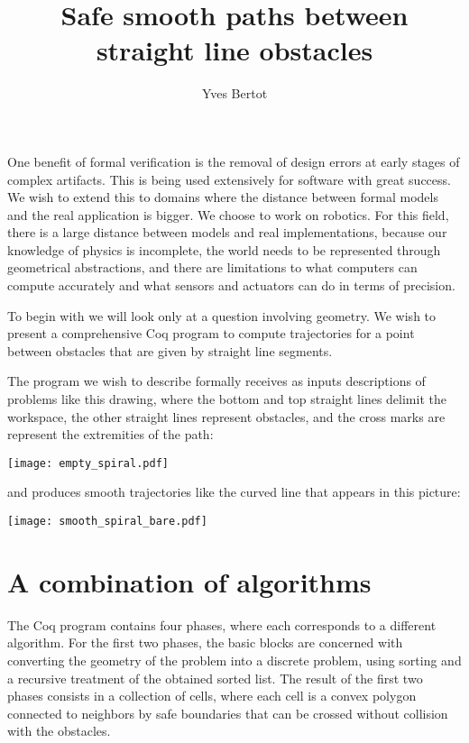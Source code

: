 \documentclass{easychair}
\title{Safe smooth paths between straight line obstacles}
\author{Yves Bertot}
\institute{Inria Université Côte d'Azur}
\begin{document}
\maketitle

One benefit of formal verification is the removal of design errors at early
stages of complex artifacts.  This is being used extensively for software
with great success.  We wish to
extend this to domains where the distance between formal models and the
real application is bigger.  We choose to work on robotics.  For this
field, there is a large distance between models and real implementations,
because our knowledge of physics is incomplete,
the world needs to be represented through geometrical abstractions, and
there are limitations to what computers can compute accurately and what
sensors and actuators can do in terms of precision.

To begin with
we will look only at a question involving geometry.  
We wish to present a comprehensive Coq program
to compute trajectories for a point between obstacles that are given by straight
line segments.

The program we wish to describe formally receives as inputs descriptions of problems like this drawing, where the bottom and top straight lines delimit the workspace, the other straight lines represent obstacles, and the cross marks are represent the extremities of the path:
\begin{center}
\texttt{[image: empty\_spiral.pdf]}
\end{center}
and produces smooth trajectories like the curved line that appears in this
picture:
\begin{center}
\texttt{[image: smooth\_spiral\_bare.pdf]}
\end{center}


\section{A combination of algorithms}
The Coq program contains four phases, where each corresponds to a different
algorithm.  For the first two phases, the basic blocks are concerned with
converting the geometry of the problem into a discrete problem, using sorting
and a recursive treatment of the obtained sorted list.  The result of the
first two phases consists in a collection of cells, where each cell is
a convex polygon connected to neighbors by safe boundaries that can
be crossed without collision with the obstacles.
\end{document}
